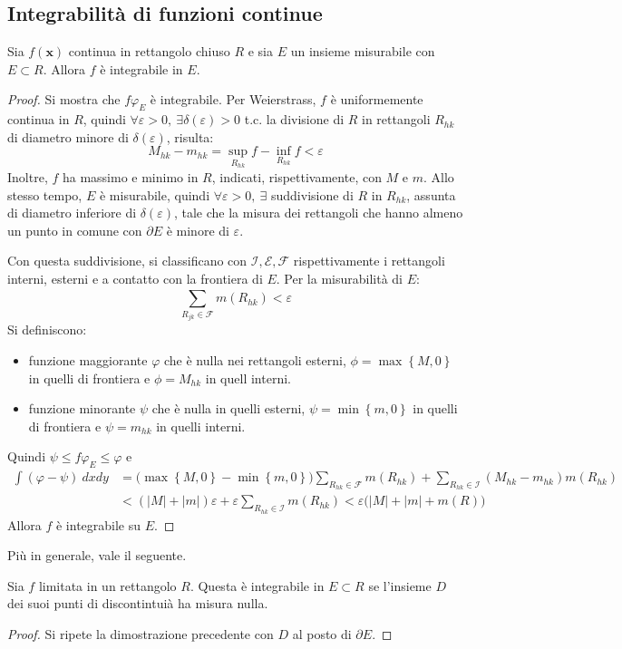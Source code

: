 \documentclass[10pt, a4paper]{scrartcl}
\theoremstyle{definition}
\numberwithin{esempio}{section}
\theoremstyle{definition}
\numberwithin{obs}{section}
\numberwithin{nota}{section}
\numberwithin{equation}{subsection}
\begin{document}
\subsection{Integrabilit\`a di funzioni continue}
\begin{teorema}
	{}{}
	Sia $f(\mathbf{x} )$ continua in rettangolo chiuso $R$ e sia $E$ un insieme misurabile con $E \subset R$. Allora $f$ \`e integrabile in $E$.
	\begin{proof}
	Si mostra che $f \varphi _E$ \`e integrabile. 
	Per Weierstrass, $f$ \`e uniformemente continua in $R$, quindi $\forall \varepsilon >0, \ \exists \delta (\varepsilon )>0$ t.c. la divisione di $R$ in rettangoli $R_{hk} $ di diametro minore di $\delta (\varepsilon )$, risulta:
	\[
	M_{hk } - m_{hk}  = \sup_{R_{hk} } f - \inf_{R_{hk} } f < \varepsilon 
	\] 
Inoltre, $f$ ha massimo e minimo in $R$, indicati, rispettivamente, con $M$ e $m$. 
Allo stesso tempo, $E$ \`e misurabile, quindi $\forall \varepsilon >0, \ \exists $ suddivisione di $R$ in $R_{hk} $, assunta di diametro inferiore di $\delta (\varepsilon )$, tale che la misura dei rettangoli che hanno almeno un punto in comune con $\partial E$ \`e minore di $\varepsilon $.

Con questa suddivisione, si classificano con $\mathcal{I}, \mathcal{E}, \mathcal{F}$ rispettivamente i rettangoli interni, esterni e a contatto con la frontiera di $E$. Per la misurabilit\`a di $E$:
\[
\sum_{R_{jk} \in \mathcal{F}}^{} m(R_{hk} ) < \varepsilon 
\] 
Si definiscono:
\begin{itemize}
	\item funzione maggiorante $\varphi  $ che \`e nulla nei rettangoli esterni, $\phi = \max\left\{ M,0 \right\} $ in quelli di frontiera e $\phi = M_{hk} $ in quell interni.
	\item funzione minorante $\psi $ che \`e nulla in quelli esterni, $\psi = \min\left\{ m , 0 \right\} $ in quelli di frontiera e $\psi  = m_{hk} $ in quelli interni.
\end{itemize}
Quindi $\psi \le f\varphi  _E \le \varphi $ e
\[
\begin{split}
	\int (\varphi-\psi )  \ dx dy&= \big(\max \left\{ M,0 \right\} - \min \left\{ m,0 \right\} \big) \sum_{R_{hk} \in \mathcal{F}}^{} m(R_{hk}) + \sum_{R_{hk} \in \mathcal{I}}^{} (M_{hk} -m_{hk} ) m(R_{hk}) \\
						   &< \left(\lvert M \rvert +\lvert m \rvert \right) \varepsilon  + \varepsilon \sum_{R_{hk} \in \mathcal{I}}^{} m(R_{hk} ) < \varepsilon \big(\lvert M \rvert +\lvert m \rvert +m(R)\big) 
\end{split}
\] 
Allora $f$ \`e integrabile su $E$.
\end{proof}
\end{teorema}
\noindent Pi\`u in generale, vale il seguente.
\begin{teorema}
	{}{}
	Sia $f$ limitata in un rettangolo $R$. Questa \`e integrabile in $E\subset R$ se l'insieme $D$ dei suoi punti di discontintui\`a ha misura nulla.
	\begin{proof}
		Si ripete la dimostrazione precedente con $D$ al posto di $\partial E$.
	\end{proof}
\end{teorema}
\end{document}
